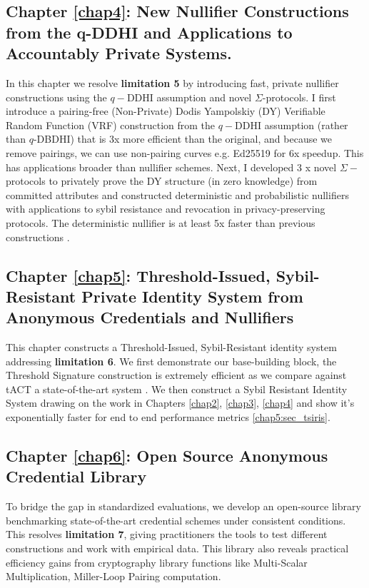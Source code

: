 \subsection{Chapter \ref{chap4}: New Nullifier Constructions from the q-DDHI and Applications to Accountably Private Systems.}
In this chapter we resolve \textbf{limitation 5} by introducing fast, private nullifier constructions using the $q-$DDHI assumption and novel $\Sigma$-protocols. I first introduce a pairing-free (Non-Private) Dodis Yampolskiy (DY) \cite{hutchison_verifiable_2005} Verifiable Random Function (VRF) construction from the $q-$DDHI assumption (rather than $q$-DBDHI) that is 3x more efficient than the original, and because we remove pairings, we can use non-pairing curves e.g. Ed25519 for 6x speedup. This has applications broader than nullifier schemes. Next, I developed 3 x novel $\Sigma-$ protocols to privately prove the DY structure (in zero knowledge) from committed attributes and constructed deterministic and probabilistic nullifiers with applications to sybil resistance and revocation in privacy-preserving protocols. The deterministic nullifier is at least 5x faster than previous constructions \cite{tomescu_utt_2022}.

\subsection{Chapter \ref{chap5}: Threshold-Issued, Sybil-Resistant Private Identity System from Anonymous Credentials and Nullifiers}
This chapter constructs a Threshold-Issued, Sybil-Resistant identity system addressing \textbf{limitation 6}. We first demonstrate our base-building block, the Threshold Signature construction is extremely efficient as we compare against tACT a state-of-the-art system \cite{rabaninejad_attribute-based_2024}. We then construct a Sybil Resistant Identity System drawing on the work in  Chapters \ref{chap2}, \ref{chap3}, \ref{chap4} and show it's exponentially faster for end to end performance metrics \ref{chap5:sec_tsiris}.

\subsection{Chapter \ref{chap6}: Open Source Anonymous Credential Library}
To bridge the gap in standardized evaluations, we develop an open-source library benchmarking state-of-the-art credential schemes under consistent conditions. This resolves \textbf{limitation 7}, giving practitioners the tools to test different constructions and work with empirical data. This library also reveals practical efficiency gains from cryptography library functions like Multi-Scalar Multiplication, Miller-Loop Pairing computation.



